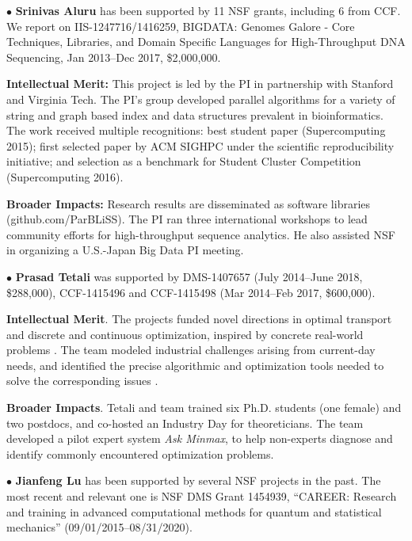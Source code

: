 \documentclass[12pt]{article}
\begin{document}
\vspace*{0.25em}
\noindent
$\bullet$
{\bf Srinivas Aluru} has been supported by 11 NSF grants, including 6 from CCF. We report on IIS-1247716/1416259, BIGDATA: Genomes Galore - Core Techniques, Libraries, and Domain Specific Languages for High-Throughput DNA Sequencing, Jan 2013--Dec 2017, \$2,000,000.

{\bf Intellectual Merit:} This project is led by the PI in partnership with Stanford and Virginia Tech. The PI's group developed parallel algorithms for a variety of string and graph based index and data structures prevalent in bioinformatics. The work received multiple recognitions: best student paper (Supercomputing 2015); first selected paper by ACM SIGHPC under the scientific reproducibility initiative; and selection as a benchmark for Student Cluster Competition (Supercomputing 2016).

{\bf Broader Impacts:} Research results are disseminated as software libraries (github.com/ParBLiSS). The PI ran three international workshops to lead community efforts for high-throughput sequence analytics. He also assisted NSF in organizing a U.S.-Japan Big Data PI meeting.

\vspace*{0.25em}
\noindent
$\bullet$
{\bf Prasad Tetali} was supported by DMS-1407657 (July 2014--June 2018, \$288,000), CCF-1415496 and CCF-1415498 (Mar 2014--Feb 2017, \$600,000).

{\bf Intellectual Merit}.
The projects funded novel directions in optimal transport and discrete and continuous optimization, inspired by concrete real-world problems \cite{gozlan2015characterization, gozlan2014kantorovich}. The team modeled industrial challenges arising from current-day needs, and identified the precise algorithmic and optimization tools needed to solve the corresponding issues \cite{christensen2017approximation}.

{\bf Broader Impacts}.
Tetali and team trained six Ph.D. students (one female) and two postdocs, and co-hosted an Industry Day for theoreticians. The team developed a pilot expert system {\em Ask Minmax}, to help non-experts diagnose and identify commonly encountered optimization problems.

\noindent
$\bullet$
\textbf{Jianfeng Lu} has been supported by several NSF projects in the
past. The most recent and relevant one is NSF DMS Grant 1454939,
``CAREER: Research and training in advanced computational methods for
quantum and statistical mechanics'' (09/01/2015--08/31/2020).
\end{document}

